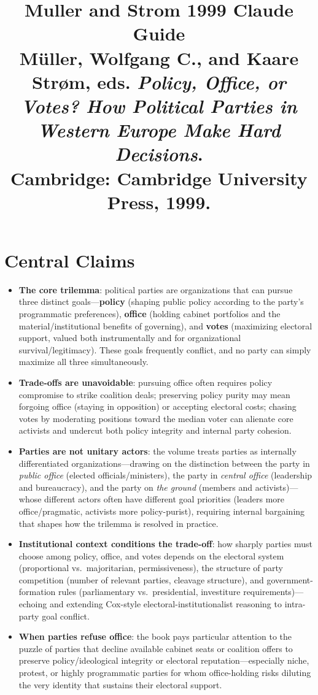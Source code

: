 \documentclass[12pt]{article}
\title{\textbf{Muller and Strom 1999 Claude Guide}\\
\large M\"uller, Wolfgang C., and Kaare Str\o m, eds. \textit{Policy, Office, or Votes? How Political Parties in Western Europe Make Hard Decisions}.\\
Cambridge: Cambridge University Press, 1999.}
\author{}
\date{}
\begin{document}
\maketitle
\tableofcontents
\newpage

\section{Central Claims}

\begin{itemize}[leftmargin=*, itemsep=4pt]
    \item \textbf{The core trilemma}: political parties are organizations that can pursue three distinct goals---\textbf{policy} (shaping public policy according to the party's programmatic preferences), \textbf{office} (holding cabinet portfolios and the material/institutional benefits of governing), and \textbf{votes} (maximizing electoral support, valued both instrumentally and for organizational survival/legitimacy). These goals frequently conflict, and no party can simply maximize all three simultaneously.
    \item \textbf{Trade-offs are unavoidable}: pursuing office often requires policy compromise to strike coalition deals; preserving policy purity may mean forgoing office (staying in opposition) or accepting electoral costs; chasing votes by moderating positions toward the median voter can alienate core activists and undercut both policy integrity and internal party cohesion.
    \item \textbf{Parties are not unitary actors}: the volume treats parties as internally differentiated organizations---drawing on the distinction between the party in \textit{public office} (elected officials/ministers), the party in \textit{central office} (leadership and bureaucracy), and the party on \textit{the ground} (members and activists)---whose different actors often have different goal priorities (leaders more office/pragmatic, activists more policy-purist), requiring internal bargaining that shapes how the trilemma is resolved in practice.
    \item \textbf{Institutional context conditions the trade-off}: how sharply parties must choose among policy, office, and votes depends on the electoral system (proportional vs.\ majoritarian, permissiveness), the structure of party competition (number of relevant parties, cleavage structure), and government-formation rules (parliamentary vs.\ presidential, investiture requirements)---echoing and extending Cox-style electoral-institutionalist reasoning to intra-party goal conflict.
    \item \textbf{When parties refuse office}: the book pays particular attention to the puzzle of parties that decline available cabinet seats or coalition offers to preserve policy/ideological integrity or electoral reputation---especially niche, protest, or highly programmatic parties for whom office-holding risks diluting the very identity that sustains their electoral support.
\end{itemize}
\end{document}
